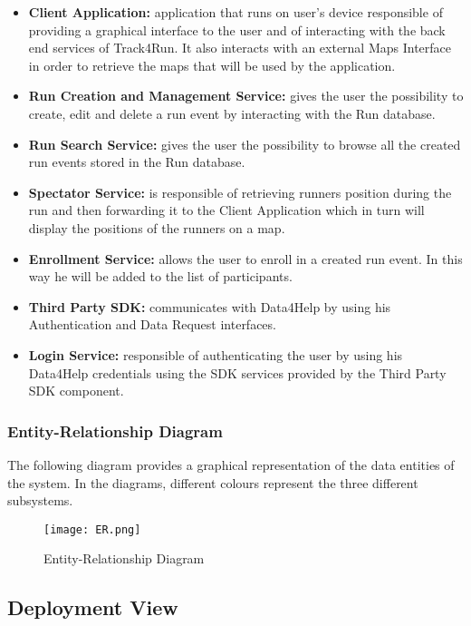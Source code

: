 \begin{itemize}
	\item \textbf{Client Application:} application that runs on user's device responsible of providing a graphical interface to the user and of interacting with the back end services of Track4Run. It also interacts with an external Maps Interface in order to retrieve the maps that will be used by the application.
	\item \textbf{Run Creation and Management Service:} gives the user the possibility to create, edit and delete a run event by interacting with the Run database.
	\item \textbf{Run Search Service:} gives the user the possibility to browse all the created run events stored in the Run database.
	\item \textbf{Spectator Service:} is responsible of retrieving runners position during the run and then forwarding it to the Client Application which in turn will display the positions of the runners on a map.
	\item \textbf{Enrollment Service:} allows the user to enroll in a created run event. In this way he will be added to the list of participants.
	\item \textbf{Third Party SDK:} communicates with Data4Help by using his Authentication and Data Request interfaces.
	\item \textbf{Login Service:} responsible of authenticating the user by using his Data4Help credentials using the SDK services provided by the Third Party SDK component.
\end{itemize}

\subsubsection{Entity-Relationship Diagram}
The following diagram provides a graphical representation of the data entities of the system. In the diagrams, different colours represent the three different subsystems.

\FloatBarrier
\begin{figure}[!h]
	\centering
	\texttt{[image: ER.png]}
	\caption{Entity-Relationship Diagram}
\end{figure}
\FloatBarrier


\subsection{Deployment View}

